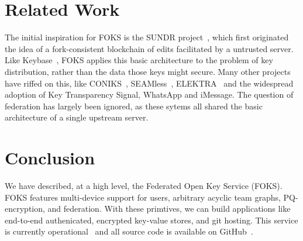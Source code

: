 \documentclass[11pt]{article}
\begin{document}








\section{Related Work}

The initial inspiration for FOKS is the SUNDR project~\cite{sundr}, which first
originated the idea of a fork-consistent blockchain of edits facilitated by a
untrusted server.  Like Keybase~\cite{keybase}, FOKS applies this basic
architecture to the problem of key distribution, rather than the data those keys
might secure. Many other projects have riffed on this, like
CONIKS~\cite{melara2015coniks}, SEAMless~\cite{chase2019seemless}, 
ELEKTRA~\cite{cryptoeprint:2024/107}
and the widespread adoption of Key Transparency
Signal, WhatsApp and iMessage.  The question of federation has largely been
ignored, as these sytems all shared the basic architecture of a single upstream
server.

\section{Conclusion}

We have described, at a high level, the Federated Open Key Service (FOKS).
FOKS features multi-device support for users, arbitrary acyclic team graphs,
PQ-encryption, and federation. With these primtives, we can build applications
like end-to-end authenicated, encrypted key-value stores, and git hosting.
This service is currently operational~\cite{foks-app} and all 
source code is available on GitHub~\cite{foks-github}.



\end{document}
